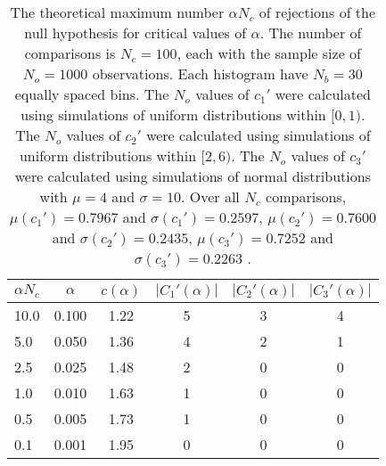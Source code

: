 \begin{table}[h!]
\begin{center}
\begin{tabular}{| l | c | c | c | c | c |}\hline
$\alpha N_c$ & $\alpha$ & $c(\alpha)$ & $|C_1'(\alpha)|$ & $|C_2'(\alpha)|$ & $|C_3'(\alpha)|$ \\\hline
10.0 & 0.100 & 1.22 & 5 & 3 & 4 \\\hline
5.0 & 0.050 & 1.36 & 4 & 2 & 1 \\\hline
2.5 & 0.025 & 1.48 & 2 & 0 & 0 \\\hline
1.0 & 0.010 & 1.63 & 1 & 0 & 0 \\\hline
0.5 & 0.005 & 1.73 & 1 & 0 & 0 \\\hline
0.1 & 0.001 & 1.95 & 0 & 0 & 0 \\\hline
\end{tabular}
\caption{The theoretical maximum number $\alpha N_c$ of rejections
of the null hypothesis for critical values of $\alpha$.
The number of comparisons is $N_c=100$,
each with the sample size of $N_o=1000$ observations.
Each histogram have $N_b=30$ equally spaced bins.
The $N_o$ values of $c_1'$ were calculated using simulations of
 uniform distributions within $[0,1)$.
The $N_o$ values of $c_2'$ were calculated using simulations of
 uniform distributions within $[2,6)$.
The $N_o$ values of $c_3'$ were calculated using simulations of
 normal distributions with $\mu=4$ and $\sigma=10$.
Over all $N_c$ comparisons,
 $\mu(c_1')=0.7967$ and $\sigma(c_1')=0.2597$,
 $\mu(c_2')=0.7600$ and $\sigma(c_2')=0.2435$,
 $\mu(c_3')=0.7252$ and $\sigma(c_3')=0.2263$ .
}
\end{center}
\end{table}